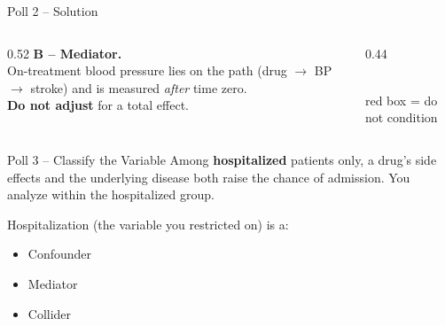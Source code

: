 \documentclass[aspectratio=169]{beamer}
\begin{document}
\begin{frame}{Poll 2 \;--\; Solution}
  \small
  \begin{columns}[T]
    \begin{column}{0.52\textwidth}
      \textcolor{good}{\textbf{B -- Mediator.}}\\[0.4em]
      On-treatment blood pressure lies on the path (drug $\to$ BP $\to$ stroke)
      and is measured \emph{after} time zero.\\[0.4em]
      \textcolor{brick}{\textbf{Do not adjust}} for a total effect.
    \end{column}
    \begin{column}{0.44\textwidth}
      \centering
      \\[0.3em]
      {\scriptsize\textcolor{brick}{red box = do not condition}}
    \end{column}
  \end{columns}
\end{frame}

\begin{frame}{Poll 3 \;--\; Classify the Variable}
  \small
  Among \textbf{hospitalized} patients only, a drug's side effects and the
  underlying disease both raise the chance of admission. You analyze within
  the hospitalized group.
  \vspace{0.8em}

  Hospitalization (the variable you restricted on) is a:
  \begin{itemize}
    \item[\textbf{A.}] Confounder
    \item[\textbf{B.}] Mediator
    \item[\textbf{C.}] Collider
  \end{itemize}
\end{frame}
\end{document}
